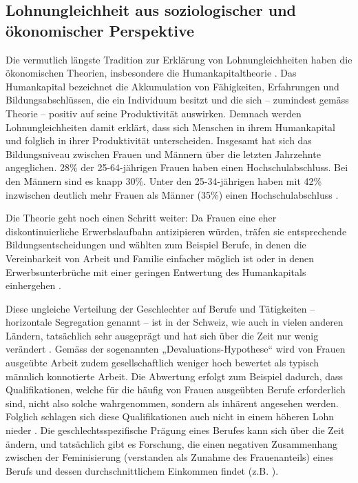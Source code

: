 \documentclass[a4paper,12pt]{article}
\renewcommand{\baselinestretch}{1.1}
\newif\ifcomments
\newcommand{\comment}[1]{%
    \ifcomments\marginpar{\renewcommand{\baselinestretch}{1}\tiny\hspace*{-1.1em}\colorbox{gray!20}%
    {\textcolor{red}{\parbox[t]{.9in}{\raggedright #1}}}}\fi}
\begin{document}
\subsection{Lohnungleichheit aus soziologischer und ökonomischer Perspektive}

Die vermutlich längste Tradition zur Erklärung von Lohnungleichheiten haben die
ökonomischen Theorien, insbesondere die Humankapitaltheorie \citep{Becker-1975,
Mincer-1958,Mincer-Polachek-1974}. Das Humankapital bezeichnet die Akkumulation
von Fähigkeiten, Erfahrungen und Bildungsabschlüssen, die ein Individuum
besitzt und die sich -- zumindest gemäss Theorie -- positiv auf seine
Produktivität auswirken. Demnach werden Lohnungleichheiten damit erklärt, dass
sich Menschen in ihrem Humankapital und folglich in ihrer Produktivität
unterscheiden. 
Insgesamt hat sich das Bildungsniveau zwischen Frauen und Männern über die letzten Jahrzehnte angeglichen. 28\% der 25-64-jährigen Frauen haben einen Hochschulabschluss. Bei den Männern sind es knapp 30\%. Unter den 25-34-jährigen haben mit 42\% inzwischen deutlich mehr Frauen als Männer (35\%) einen Hochschulabschluss \citep{BFS-2019b}. 

Die Theorie geht noch einen Schritt weiter: Da Frauen eine eher
diskontinuierliche Erwerbslaufbahn antizipieren würden, träfen sie entsprechende
Bildungsentscheidungen und wählten zum Beispiel Berufe, in denen die
Vereinbarkeit von Arbeit und Familie einfacher möglich ist oder in denen
Erwerbsunterbrüche mit einer geringen Entwertung des Humankapitals einhergehen
\citep{Polachek-1981}.

\comment{diesen Abschnitt in den Theorieteil?}
Diese ungleiche Verteilung der Geschlechter auf Berufe und Tätigkeiten -- horizontale Segregation genannt -- ist in der Schweiz, wie auch in vielen anderen Ländern, tatsächlich sehr ausgeprägt und hat sich über die Zeit nur wenig verändert \citep{Buchmann-Kriesi-2012,Charles-2005,Schwiter-etal-2014}.
Gemäss der sogenannten „Devaluations-Hypothese“
\citep{England-etal-1988,Liebeskind-2004} wird von Frauen ausgeübte Arbeit zudem 
gesellschaftlich weniger hoch bewertet als typisch männlich konnotierte Arbeit. Die
Abwertung erfolgt zum Beispiel dadurch, dass Qualifikationen, welche für die
häufig von Frauen ausgeübten Berufe erforderlich sind, nicht also solche
wahrgenommen, sondern als inhärent angesehen werden. Folglich schlagen sich
diese Qualifikationen auch nicht in einem höheren Lohn nieder
\citep{England-1992,England-2005,Gottschall-1995}. Die geschlechtsspezifische
Prägung eines Berufes kann sich über die Zeit ändern, und tatsächlich gibt es
Forschung, die einen negativen Zusammenhang zwischen der Feminisierung
(verstanden als Zunahme des Frauenanteils) eines Berufs und dessen
durchschnittlichem Einkommen findet (z.B.
\citealp{Levanon-etal-2009,Murphy-Oesch-2016}).
\end{document}
